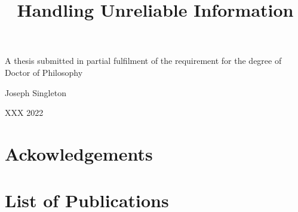 \documentclass[a4paper,11pt,oneside]{memoir}
\title{
    Handling Unreliable Information
}
\begin{document}
\begin{titlingpage}

    \begin{center}
        {\HUGE\bfseries \thetitle}
        \par
        \vspace{2cm}
        {\Large A thesis submitted in partial fulfilment of the requirement for the
        degree of Doctor of Philosophy}
        \par
        \vspace{2cm}
        {\LARGE Joseph Singleton}
        \par
        \vspace{10cm}
        {\Large XXX 2022}
    \end{center}

    \clearpage

    \begin{abstract}
        
    \end{abstract}

\end{titlingpage}

\frontmatter
\tableofcontents

\clearpage

\chapter*{Ackowledgements}


\chapter*{List of Publications}


\mainmatter



\printbibliography
\end{document}
